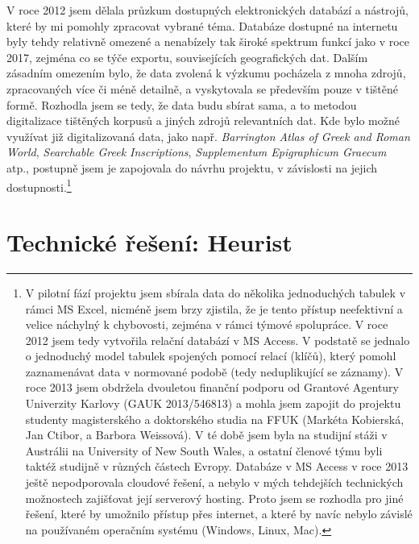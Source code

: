 V roce 2012 jsem dělala průzkum dostupných elektronických databází a nástrojů, které by mi pomohly zpracovat vybrané téma. Databáze dostupné na internetu byly tehdy relativně omezené a nenabízely tak široké spektrum funkcí jako v roce 2017, zejména co se týče exportu, souvisejících geografických dat. Dalším zásadním omezením bylo, že data zvolená k výzkumu pocházela z mnoha zdrojů, zpracovaných více či méně detailně, a vyskytovala se především pouze v tištěné formě. Rozhodla jsem se tedy, že data budu sbírat sama, a to metodou digitalizace tištěných korpusů a jiných zdrojů relevantních dat. Kde bylo možné využívat již digitalizovaná data, jako např. {\em Barrington Atlas of Greek and Roman World}, {\em Searchable Greek Inscriptions}, {\em Supplementum Epigraphicum Graecum} atp., postupně jsem je zapojovala do návrhu projektu, v závislosti na jejich dostupnosti.\footnote{V pilotní fází projektu jsem sbírala data do několika jednoduchých tabulek v rámci MS Excel, nicméně jsem brzy zjistila, že je tento přístup neefektivní a velice náchylný k chybovosti, zejména v rámci týmové spolupráce. V roce 2012 jsem tedy vytvořila relační databází v MS Access. V podstatě se jednalo o jednoduchý model tabulek spojených pomocí relací (klíčů), který pomohl zaznamenávat data v normované podobě (tedy neduplikující se záznamy). V roce 2013 jsem obdržela dvouletou finanční podporu od Grantové Agentury Univerzity Karlovy (GAUK 2013/546813) a mohla jsem zapojit do projektu studenty magisterského a doktorského studia na FFUK (Markéta Kobierská, Jan Ctibor, a Barbora Weissová). V té době jsem byla na studijní stáži v Austrálii na University of New South Wales, a ostatní členové týmu byli taktéž studijně v různých částech Evropy. Databáze v MS Access v roce 2013 ještě nepodporovala cloudové řešení, a nebylo v mých tehdejších technických možnostech zajišťovat její serverový hosting. Proto jsem se rozhodla pro jiné řešení, které by umožnilo přístup přes internet, a které by navíc nebylo závislé na používaném operačním systému (Windows, Linux, Mac).}

\section[technické-řešení-heurist]{Technické řešení: Heurist}

